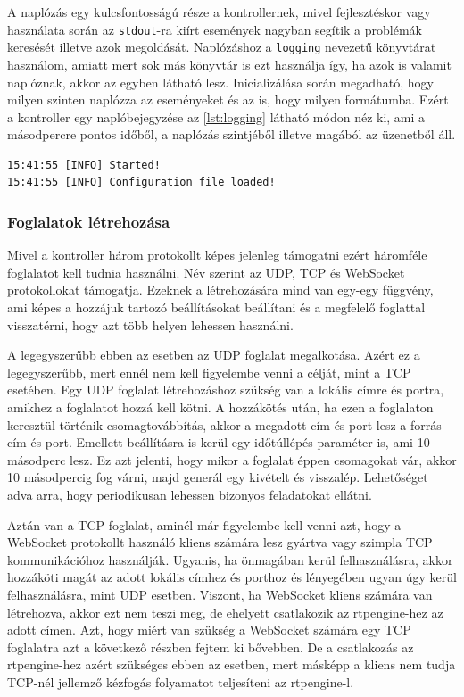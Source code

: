 A naplózás egy kulcsfontosságú része a kontrollernek, mivel fejlesztéskor vagy használata
során az \texttt{stdout}-ra kiírt események nagyban segítik a problémák keresését illetve 
azok megoldását. Naplózáshoz a \texttt{logging} \cite{logging} nevezetű könyvtárat 
használom, amiatt mert sok más könyvtár is ezt használja így, ha azok is valamit 
naplóznak, akkor az egyben látható lesz. Inicializálása során megadható, hogy milyen 
szinten naplózza az eseményeket és az is, hogy milyen formátumba. Ezért a kontroller egy 
naplóbejegyzése az \ref{lst:logging} látható módon néz ki, ami a másodpercre pontos 
időből, a naplózás szintjéből illetve magából az üzenetből áll.

\begin{lstlisting}[caption=Naplózás formátuma, label=lst:logging]
15:41:55 [INFO] Started!
15:41:55 [INFO] Configuration file loaded!
\end{lstlisting}

\subsubsection{Foglalatok létrehozása}

Mivel a kontroller három protokollt képes jelenleg támogatni ezért háromféle foglalatot 
kell tudnia használni. Név szerint az UDP, TCP és WebSocket protokollokat támogatja. 
Ezeknek a létrehozására mind van egy-egy függvény, ami képes a hozzájuk tartozó 
beállításokat beállítani és a megfelelő foglattal visszatérni, hogy azt több helyen 
lehessen használni.

A legegyszerűbb ebben az esetben az UDP foglalat megalkotása. Azért ez a legegyszerűbb,
mert ennél nem kell figyelembe venni a célját, mint a TCP esetében. Egy UDP foglalat 
létrehozáshoz szükség van a lokális címre és portra, amikhez a foglalatot hozzá kell 
kötni. A hozzákötés után, ha ezen a foglalaton keresztül történik csomagtovábbítás, 
akkor a megadott cím és port lesz a forrás cím és port. Emellett beállításra is
kerül egy időtúllépés paraméter is, ami 10 másodperc lesz. Ez azt jelenti, hogy
mikor a foglalat éppen csomagokat vár, akkor 10 másodpercig fog várni, majd generál 
egy kivételt és visszalép. Lehetőséget adva arra, hogy periodikusan lehessen
bizonyos feladatokat ellátni. 

Aztán van a TCP foglalat, aminél már figyelembe kell venni azt, hogy a WebSocket
protokollt használó kliens számára lesz gyártva vagy szimpla TCP kommunikációhoz 
használják. Ugyanis, ha önmagában kerül felhasználásra, akkor hozzáköti magát
az adott lokális címhez és porthoz és lényegében ugyan úgy kerül felhasználásra,
mint UDP esetben. Viszont, ha WebSocket kliens számára van létrehozva, akkor ezt
nem teszi meg, de ehelyett csatlakozik az rtpengine-hez az adott címen. Azt, hogy
miért van szükség a WebSocket számára egy TCP foglalatra azt a következő részben 
fejtem ki bővebben. De a csatlakozás az rtpengine-hez azért szükséges ebben az
esetben, mert másképp a kliens nem tudja TCP-nél jellemző kézfogás folyamatot
teljesíteni az rtpengine-l.

